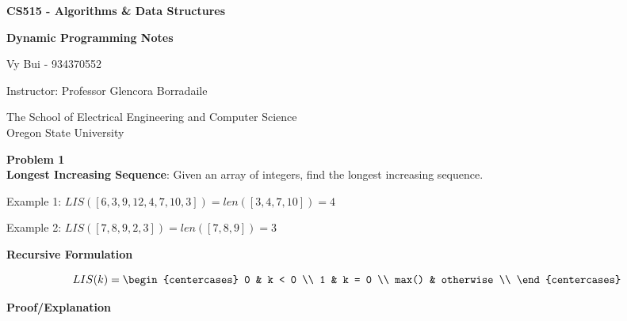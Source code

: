 \documentclass[12pt,article]{article}
\newenvironment{problem}[2][Problem]
    { \begin{mdframed}[backgroundcolor=gray!20] \textbf{#1 #2} \\}
    {  \end{mdframed}}
\begin{document}
\begin{titlepage}
    \begin{center}
        \vspace*{4cm}

        \textbf{\Large CS515 - Algorithms \& Data Structures}

        \vspace{0.5cm}
 
        \textbf{\Large Dynamic Programming Notes}
 
        \vspace{1cm}

        Vy Bui - 934370552

        \vspace{2cm}

        Instructor: Professor Glencora Borradaile
        \vfill
             
        \vspace{0.8cm}
      
             
        The School of Electrical Engineering and Computer Science\\
        Oregon State University\\
             
    \end{center}
\end{titlepage}

\begin{problem}{1}
\textbf{Longest Increasing Sequence}: Given an array of integers, find the longest increasing sequence. 

Example 1: $LIS([6,3,9,12,4,7,10,3]) = len([3,4,7,10]) = 4$

Example 2: $LIS([7,8,9,2,3]) = len([7,8,9]) = 3$

\end{problem}

\textbf{Recursive Formulation}

\tiny{
    \[
        LIS(k)=
        \begin{centercases}
            0               & k < 0 \\
            1               & k = 0 \\
            max()                & otherwise \\
        \end{centercases}
        \]
}

\normalsize{}

\textbf{Proof/Explanation}
\end{document}
